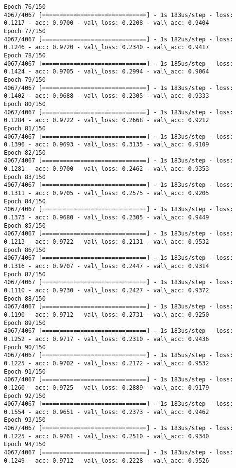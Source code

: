 \documentclass[11pt]{article}
\begin{document}
\begin{Verbatim}[commandchars=\\\{\}]
Epoch 76/150
4067/4067 [==============================] - 1s 183us/step - loss: 0.1217 - acc: 0.9700 - val\_loss: 0.2208 - val\_acc: 0.9404
Epoch 77/150
4067/4067 [==============================] - 1s 182us/step - loss: 0.1246 - acc: 0.9720 - val\_loss: 0.2340 - val\_acc: 0.9417
Epoch 78/150
4067/4067 [==============================] - 1s 185us/step - loss: 0.1424 - acc: 0.9705 - val\_loss: 0.2994 - val\_acc: 0.9064
Epoch 79/150
4067/4067 [==============================] - 1s 183us/step - loss: 0.1402 - acc: 0.9688 - val\_loss: 0.2305 - val\_acc: 0.9333
Epoch 80/150
4067/4067 [==============================] - 1s 183us/step - loss: 0.1284 - acc: 0.9722 - val\_loss: 0.2668 - val\_acc: 0.9212
Epoch 81/150
4067/4067 [==============================] - 1s 183us/step - loss: 0.1396 - acc: 0.9693 - val\_loss: 0.3135 - val\_acc: 0.9109
Epoch 82/150
4067/4067 [==============================] - 1s 183us/step - loss: 0.1281 - acc: 0.9700 - val\_loss: 0.2462 - val\_acc: 0.9353
Epoch 83/150
4067/4067 [==============================] - 1s 183us/step - loss: 0.1311 - acc: 0.9705 - val\_loss: 0.2575 - val\_acc: 0.9205
Epoch 84/150
4067/4067 [==============================] - 1s 183us/step - loss: 0.1373 - acc: 0.9680 - val\_loss: 0.2305 - val\_acc: 0.9449
Epoch 85/150
4067/4067 [==============================] - 1s 183us/step - loss: 0.1213 - acc: 0.9722 - val\_loss: 0.2131 - val\_acc: 0.9532
Epoch 86/150
4067/4067 [==============================] - 1s 183us/step - loss: 0.1316 - acc: 0.9707 - val\_loss: 0.2447 - val\_acc: 0.9314
Epoch 87/150
4067/4067 [==============================] - 1s 183us/step - loss: 0.1110 - acc: 0.9730 - val\_loss: 0.2427 - val\_acc: 0.9372
Epoch 88/150
4067/4067 [==============================] - 1s 183us/step - loss: 0.1190 - acc: 0.9712 - val\_loss: 0.2731 - val\_acc: 0.9250
Epoch 89/150
4067/4067 [==============================] - 1s 183us/step - loss: 0.1252 - acc: 0.9717 - val\_loss: 0.2310 - val\_acc: 0.9436
Epoch 90/150
4067/4067 [==============================] - 1s 185us/step - loss: 0.1225 - acc: 0.9702 - val\_loss: 0.2172 - val\_acc: 0.9532
Epoch 91/150
4067/4067 [==============================] - 1s 183us/step - loss: 0.1260 - acc: 0.9725 - val\_loss: 0.2889 - val\_acc: 0.9179
Epoch 92/150
4067/4067 [==============================] - 1s 183us/step - loss: 0.1554 - acc: 0.9651 - val\_loss: 0.2373 - val\_acc: 0.9462
Epoch 93/150
4067/4067 [==============================] - 1s 183us/step - loss: 0.1225 - acc: 0.9761 - val\_loss: 0.2510 - val\_acc: 0.9340
Epoch 94/150
4067/4067 [==============================] - 1s 183us/step - loss: 0.1249 - acc: 0.9712 - val\_loss: 0.2228 - val\_acc: 0.9526

\end{Verbatim}
\end{document}
